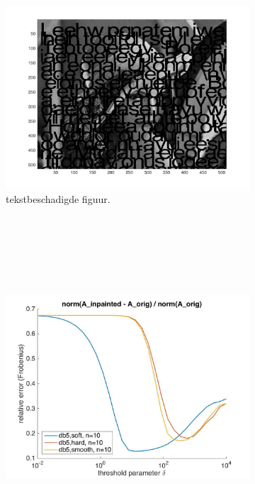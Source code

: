 \begin{figure}
    \centering
    \begin{subfigure}[b]{0.45\textwidth}
        \includegraphics[width=\textwidth]{../src/inpainting/lena_broke2}
        \caption{tekstbeschadigde figuur. \\ \ \\ \ \\ \ \\ \ \\}
        \label{fig:fig1}
    \end{subfigure}
    ~ %
    \begin{subfigure}[b]{0.45\textwidth}
        \includegraphics[width=\textwidth]{../src/inpainting/paint_letters_db5_threskinds_it50}

\end{subfigure}
\end{figure}
